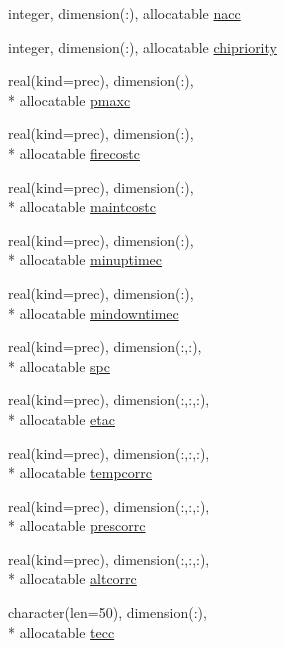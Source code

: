 \begin{DoxyCompactItemize}
\item 
integer, dimension(\-:), allocatable \hyperlink{classinputvar_a8e4bb497a3825e6f554e3268dd2bbd63}{nacc}
\item 
integer, dimension(\-:), allocatable \hyperlink{classinputvar_a2cb9252c074d0ed99a8ec738dfc04ee2}{chipriority}
\item 
real(kind=prec), dimension(\-:), \\*
allocatable \hyperlink{classinputvar_a93b555571bee30038d48c86de7ab5c14}{pmaxc}
\item 
real(kind=prec), dimension(\-:), \\*
allocatable \hyperlink{classinputvar_afa2d0c05087f3cda5d3e984037a2a354}{firecostc}
\item 
real(kind=prec), dimension(\-:), \\*
allocatable \hyperlink{classinputvar_a4371de15edf20ae9883b07b3b843655d}{maintcostc}
\item 
real(kind=prec), dimension(\-:), \\*
allocatable \hyperlink{classinputvar_a1c2a4cc32567b94cb7a884d3731bb5f4}{minuptimec}
\item 
real(kind=prec), dimension(\-:), \\*
allocatable \hyperlink{classinputvar_a9bb1424e04e5c89d561d2316045f98d4}{mindowntimec}
\item 
real(kind=prec), dimension(\-:,\-:), \\*
allocatable \hyperlink{classinputvar_a7a6b03a57941065017f0fe71a9d641f1}{spc}
\item 
real(kind=prec), dimension(\-:,\-:,\-:), \\*
allocatable \hyperlink{classinputvar_a3c6d7517ec3f9097a8d4264b50e61b48}{etac}
\item 
real(kind=prec), dimension(\-:,\-:,\-:), \\*
allocatable \hyperlink{classinputvar_a378a362979a22545cd843bbf687ca511}{tempcorrc}
\item 
real(kind=prec), dimension(\-:,\-:,\-:), \\*
allocatable \hyperlink{classinputvar_a4ad15e4562f67332a82dd70d6cfcb2fc}{prescorrc}
\item 
real(kind=prec), dimension(\-:,\-:,\-:), \\*
allocatable \hyperlink{classinputvar_a9fe000c19d0cd93b0e53d5d6b2cbc13f}{altcorrc}
\item 
character(len=50), dimension(\-:), \\*
allocatable \hyperlink{classinputvar_a2eb1c20cfae159c006e0fdc4b9ef0ef0}{tecc}

\end{DoxyCompactItemize}
